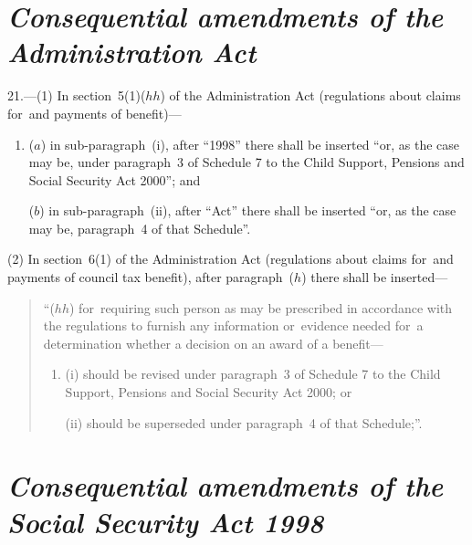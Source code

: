 \documentclass[12pt,a4paper]{article}
\begin{document}


\section*{\itshape  Consequential amendments of the Administration Act}

21.---(1) In section~5(1)($hh$)  of the Administration Act (regulations about claims for~and payments of benefit)—
\begin{enumerate}\item[]
($a$) in sub-paragraph~(i), after “1998” there shall be inserted “or, as the case may be, under paragraph~3 of Schedule 7 to the Child Support, Pensions and Social Security Act 2000”; and

($b$) in sub-paragraph~(ii), after “Act” there shall be inserted “or, as the case may be, paragraph~4 of that Schedule”.
\end{enumerate}

(2) In section~6(1)  of the Administration Act (regulations about claims for~and payments of council tax benefit), after paragraph~($h$)  there shall be inserted—
\begin{quotation}
“($hh$) for~requiring such person as may be prescribed in accordance with the regulations to furnish any information or~evidence needed for~a determination whether a decision on an award of a benefit—
\begin{enumerate}\item[]
(i) should be revised under paragraph~3 of Schedule 7 to the Child Support, Pensions and Social Security Act 2000; or

(ii) should be superseded under paragraph~4 of that Schedule;”.
\end{enumerate}
\end{quotation}

\section*{\itshape Consequential amendments of the Social Security Act 1998}
\end{document}
